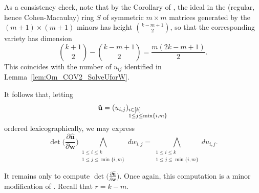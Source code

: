 \documentclass[twoside]{amsart}
\theoremstyle{definition}
\theoremstyle{remark}
\numberwithin{equation}{section}
\begin{document}
As a consistency check, note that by the Corollary of \cite[Thrm.~1]{Kutz}, the ideal in the (regular, hence Cohen-Macaulay) ring $S$ of symmetric
$m\times m$ matrices generated by the $(m+1)\times(m+1)$ minors has height ${k - m + 1 \choose 2}$, so that the corresponding variety has dimension
\[
    {k + 1 \choose 2} - {k - m + 1 \choose 2}
    =   \frac{m(2k - m + 1)}{2}.
\]
This coincides with the number of $u_{ij}$ identified in Lemma~\ref{lem:Om_COV2_SolveUforW}.

It follows that, letting
\begin{equation}
\label{eq:Om_COV2_DefUHat}
    \hat{\mathbf{u}} = (u_{i,j})_{\begin{subarray}{l} i\in[k] \\ 1\leq j \leq \min\{i,m\}\end{subarray}}
\end{equation}
ordered lexicographically, we may express
\begin{equation}
\label{eq:Om_COV2_dwTodu}
    \det\Big(\frac{\partial \hat{\mathbf{u}} }{\partial \mathbf{w} }\Big)
        \bigwedge\limits_{\substack{1\leq i\leq k \\ 1\leq j \leq {\min\{i,m\}} }}  dw_{i,j}
    =
    \bigwedge\limits_{\substack{1\leq i\leq k \\ 1\leq j \leq {\min\{i,m\}} }}  du_{i,j}.
\end{equation}

It remains only to compute $\det\big(\frac{\partial \hat{\mathbf{u}} }{\partial \mathbf{w} }\big)$.
Once again, this computation is a minor modification of \cite[Lem.~3.2]{HerbigSeatonWhitesell}.
Recall that $r = k - m$.
\end{document}
